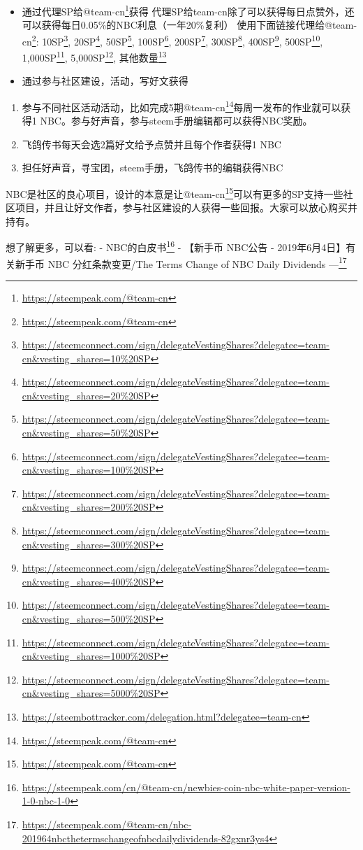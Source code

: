 \documentclass[]{ctexbook}
\providecommand{\tightlist}{%
  \setlength{\itemsep}{0pt}\setlength{\parskip}{0pt}}
\renewcommand{\href}[2]{#2\footnote{\url{#1}}}
\begin{document}
\begin{itemize}
\tightlist
\item
  通过代理SP给\href{https://steempeak.com/@team-cn}{@team-cn}获得 代理SP给team-cn除了可以获得每日点赞外，还可以获得每日0.05\%的NBC利息（一年20\%复利）
  使用下面链接代理给\href{https://steempeak.com/@team-cn}{@team-cn}: \href{https://steemconnect.com/sign/delegateVestingShares?delegatee=team-cn\&vesting_shares=10\%20SP}{10SP}, \href{https://steemconnect.com/sign/delegateVestingShares?delegatee=team-cn\&vesting_shares=20\%20SP}{20SP}, \href{https://steemconnect.com/sign/delegateVestingShares?delegatee=team-cn\&vesting_shares=50\%20SP}{50SP}, \href{https://steemconnect.com/sign/delegateVestingShares?delegatee=team-cn\&vesting_shares=100\%20SP}{100SP}, \href{https://steemconnect.com/sign/delegateVestingShares?delegatee=team-cn\&vesting_shares=200\%20SP}{200SP}, \href{https://steemconnect.com/sign/delegateVestingShares?delegatee=team-cn\&vesting_shares=300\%20SP}{300SP}, \href{https://steemconnect.com/sign/delegateVestingShares?delegatee=team-cn\&vesting_shares=400\%20SP}{400SP}, \href{https://steemconnect.com/sign/delegateVestingShares?delegatee=team-cn\&vesting_shares=500\%20SP}{500SP}, \href{https://steemconnect.com/sign/delegateVestingShares?delegatee=team-cn\&vesting_shares=1000\%20SP}{1,000SP}, \href{https://steemconnect.com/sign/delegateVestingShares?delegatee=team-cn\&vesting_shares=5000\%20SP}{5,000SP}, \href{https://steembottracker.com/delegation.html?delegatee=team-cn}{其他数量}
\item
  通过参与社区建设，活动，写好文获得
\end{itemize}

\begin{enumerate}
\def\labelenumi{\arabic{enumi}.}
\tightlist
\item
  参与不同社区活动活动，比如完成5期\href{https://steempeak.com/@team-cn}{@team-cn}每周一发布的作业就可以获得1 NBC。参与好声音，参与steem手册编辑都可以获得NBC奖励。
\item
  飞鸽传书每天会选2篇好文给予点赞并且每个作者获得1 NBC
\item
  担任好声音，寻宝团，steem手册，飞鸽传书的编辑获得NBC
\end{enumerate}

NBC是社区的良心项目，设计的本意是让\href{https://steempeak.com/@team-cn}{@team-cn}可以有更多的SP支持一些社区项目，并且让好文作者，参与社区建设的人获得一些回报。大家可以放心购买并持有。

想了解更多，可以看:
- \href{https://steempeak.com/cn/@team-cn/newbies-coin-nbc-white-paper-version-1-0-nbc-1-0}{NBC的白皮书}
- \href{https://steempeak.com/@team-cn/nbc-201964nbcthetermschangeofnbcdailydividends-82gxnr3ys4}{【新手币 NBC公告 - 2019年6月4日】有关新手币 NBC 分红条款变更/The Terms Change of NBC Daily Dividends ---}
\end{document}
